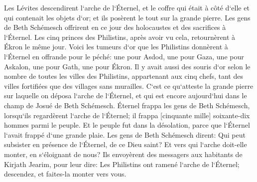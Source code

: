 \verse Les Lévites descendirent l`arche de l`Éternel, et le coffre qui était à côté d`elle et qui contenait les objets d`or; et ils posèrent le tout sur la grande pierre. Les gens de Beth Schémesch offrirent en ce jour des holocaustes et des sacrifices à l`Éternel. 
\verse Les cinq princes des Philistins, après avoir vu cela, retournèrent à Ékron le même jour. 
\verse Voici les tumeurs d`or que les Philistins donnèrent à l`Éternel en offrande pour le péché: une pour Asdod, une pour Gaza, une pour Askalon, une pour Gath, une pour Ékron. 
\verse Il y avait aussi des souris d`or selon le nombre de toutes les villes des Philistins, appartenant aux cinq chefs, tant des villes fortifiées que des villages sans murailles. C`est ce qu`atteste la grande pierre sur laquelle on déposa l`arche de l`Éternel, et qui est encore aujourd`hui dans le champ de Josué de Beth Schémesch. 
\verse Éternel frappa les gens de Beth Schémesch, lorsqu`ils regardèrent l`arche de l`Éternel; il frappa [cinquante mille] soixante-dix hommes parmi le peuple. Et le peuple fut dans la désolation, parce que l`Éternel l`avait frappé d`une grande plaie. 
\verse Les gens de Beth Schémesch dirent: Qui peut subsister en présence de l`Éternel, de ce Dieu saint? Et vers qui l`arche doit-elle monter, en s`éloignant de nous? 
\verse Ils envoyèrent des messagers aux habitants de Kirjath Jearim, pour leur dire: Les Philistins ont ramené l`arche de l`Éternel; descendez, et faites-la monter vers vous. 

\chapter{}

